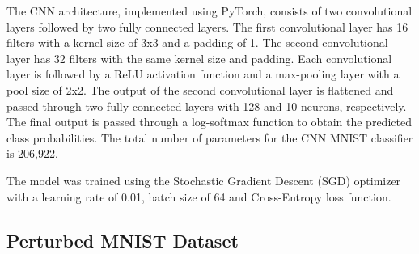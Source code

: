 The CNN architecture, implemented using PyTorch, consists of two convolutional layers followed by two fully connected layers. The first convolutional layer has 16 filters with a kernel size of 3x3 and a padding of 1. The second convolutional layer has 32 filters with the same kernel size and padding. Each convolutional layer is followed by a ReLU activation function and a max-pooling layer with a pool size of 2x2. The output of the second convolutional layer is flattened and passed through two fully connected layers with 128 and 10 neurons, respectively. The final output is passed through a log-softmax function to obtain the predicted class probabilities. The total number of parameters for the CNN MNIST classifier is 206,922.

The model was trained using the Stochastic Gradient Descent (SGD) optimizer with a learning rate of 0.01, batch size of 64 and Cross-Entropy loss function. %


\subsection{Perturbed MNIST Dataset}
\label{methods:PerturbedMNISTDataset}


